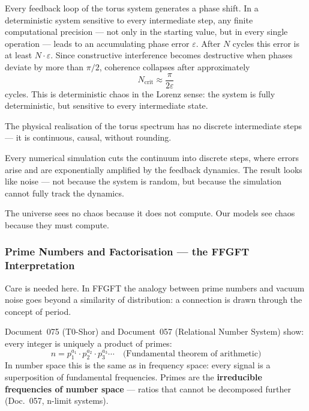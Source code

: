 Every feedback loop of the torus system generates a phase shift. In a deterministic
system sensitive to every intermediate step, any finite computational precision —
not only in the starting value, but in every single operation — leads to an
accumulating phase error $\varepsilon$. After $N$ cycles this error is at least
$N \cdot \varepsilon$. Since constructive interference becomes destructive when
phases deviate by more than $\pi/2$, coherence collapses after approximately
\begin{equation}
    N_\text{crit} \approx \frac{\pi}{2\varepsilon}
\end{equation}
cycles. This is deterministic chaos in the Lorenz sense: the system is fully
deterministic, but sensitive to every intermediate state.

\begin{keypoint}
The physical realisation of the torus spectrum has no discrete intermediate steps —
it is continuous, causal, without rounding.

Every numerical simulation cuts the continuum into discrete steps, where errors
arise and are exponentially amplified by the feedback dynamics. The result looks
like noise — not because the system is random, but because the simulation cannot
fully track the dynamics.

The universe sees no chaos because it does not compute.
Our models see chaos because they must compute.
\end{keypoint}

\subsubsection*{Prime Numbers and Factorisation — the FFGFT Interpretation}

Care is needed here. In FFGFT the analogy between prime numbers and vacuum noise goes
beyond a similarity of distribution: a connection is drawn through the
concept of period.

Document~075 (T0-Shor) and Document~057 (Relational Number System) show:
every integer is uniquely a product of primes:
\begin{equation}
    n = p_1^{a_1} \cdot p_2^{a_2} \cdot p_3^{a_3} \cdots
    \quad \text{(Fundamental theorem of arithmetic)}
\end{equation}
In number space this is the same as in frequency space: every signal is a
superposition of fundamental frequencies. Primes are the \textbf{irreducible
frequencies of number space} — ratios that cannot be decomposed further
(Doc.~057, n-limit systems).

